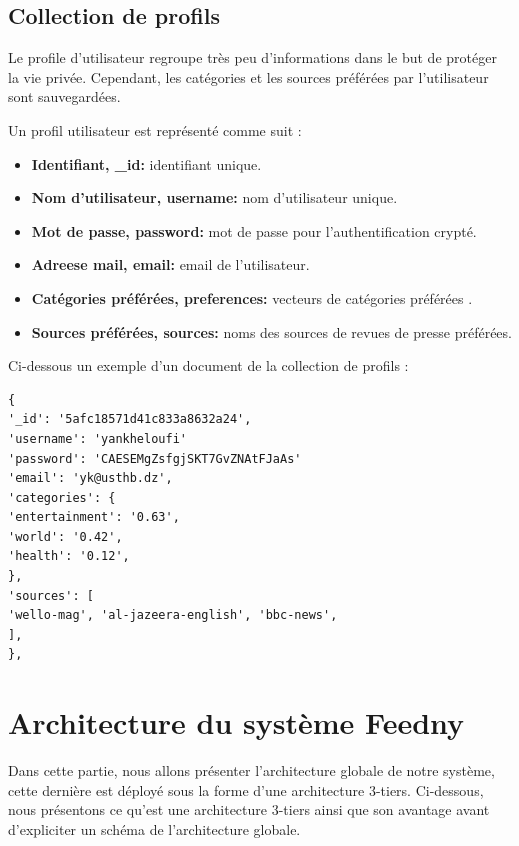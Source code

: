 \subsection{Collection de profils}
Le profile d'utilisateur regroupe très peu d'informations dans le but de protéger la vie privée. Cependant, les catégories et les sources préférées par l'utilisateur sont sauvegardées. 

Un profil utilisateur est représenté comme suit :
\begin{itemize}
    \item \textbf{Identifiant, \textquotedbl  \_id\textquotedbl : } identifiant unique.
    \item \textbf{Nom d'utilisateur, \textquotedbl  username\textquotedbl : } nom d'utilisateur unique.
    \item \textbf{Mot de passe, \textquotedbl  password\textquotedbl : } mot de passe pour l'authentification crypté.
    \item \textbf{Adreese mail, \textquotedbl  email\textquotedbl : } email de l'utilisateur.
    \item \textbf{Catégories préférées, \textquotedbl  preferences\textquotedbl : } vecteurs de catégories préférées .
    \item \textbf{Sources préférées, \textquotedbl  sources\textquotedbl : } noms des sources de revues de presse préférées. 
\end{itemize}

Ci-dessous un exemple d'un document de la collection de profils :
\begin{lstlisting}[style=code]
{
'_id': '5afc18571d41c833a8632a24', 
'username': 'yankheloufi'
'password': 'CAESEMgZsfgjSKT7GvZNAtFJaAs'
'email': 'yk@usthb.dz',
'categories': {
'entertainment': '0.63',
'world': '0.42',
'health': '0.12',
},
'sources': [
'wello-mag', 'al-jazeera-english', 'bbc-news', 
],
},
\end{lstlisting}



\section{Architecture du système \textquotedbl Feedny\textquotedbl}
Dans cette partie, nous allons présenter l'architecture globale de notre système, cette dernière est déployé sous la forme d'une architecture 3-tiers. Ci-dessous, nous présentons ce qu'est une architecture 3-tiers ainsi que son avantage avant d'expliciter un schéma de l'architecture globale.

